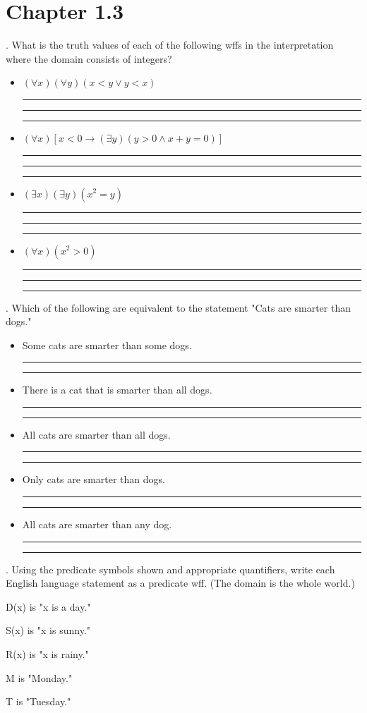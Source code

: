 \documentclass{article}
\newcommand{\answerline}{\newline\newline\noindent\rule{0.95\textwidth}{0.4pt}}
\begin{document}
\section*{Chapter 1.3}

. What is the truth values of each of the following wffs in the interpretation where the domain consists of integers?
\begin{itemize}
    \item[a.] $(\forall x)(\forall y)(x < y \vee y < x)$
    \answerline
    \answerline
    \answerline
    \item[b.] $(\forall x)[x < 0 \rightarrow (\exists y)(y > 0 \wedge x + y = 0)]$
        \answerline
    \answerline
    \answerline
    \item[c.] $(\exists x)(\exists y)(x^2 = y)$
    \answerline
    \answerline
    \answerline
    \item[d.] $(\forall x)(x^2 > 0)$
    \answerline
    \answerline
    \answerline
\end{itemize}

\newpage
{}. Which of the following are equivalent to the statement "Cats are smarter than dogs."
\begin{itemize}
    \item[a.] Some cats are smarter than some dogs.
    \answerline
    \answerline
    \item[b.] There is a cat that is smarter than all dogs.
    \answerline
    \answerline
    \item[c.] All cats are smarter than all dogs.
    \answerline
    \answerline
    \item[d.] Only cats are smarter than dogs.
    \answerline
    \answerline
    \item[e.] All cats are smarter than any dog.
    \answerline
    \answerline
\end{itemize}

\newpage
{}. Using the predicate symbols shown and appropriate quantifiers, write each English language statement as a predicate wff. (The domain is the whole world.)

D(x) is "x is a day."

S(x) is "x is sunny."

R(x) is "x is rainy."

M is "Monday."

T is "Tuesday."
\end{document}
